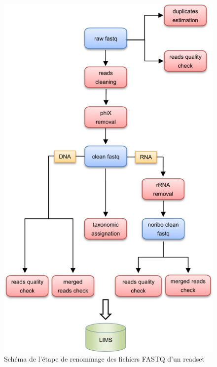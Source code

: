 \begin{minipage}{0.45\textwidth}
    \begin{figure}[H]
        \centering
        \includegraphics[width=1\textwidth]{img/schema-workflow-ngsqc.png}
        \caption{\footnotesize{Schéma de l'étape de renommage des fichiers FASTQ d'un readset}}
        \label{schema-workflow-ngsqc}
    \end{figure}
\end{minipage}
\hfill
